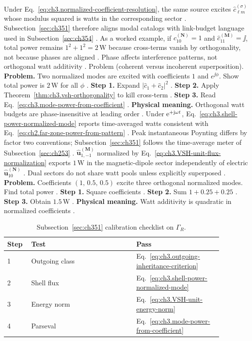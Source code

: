 Under Eq.~\eqref{eq:ch3.normalized-coefficient-resolution}, the same source excites \(\widehat{c}_{\ell m}^{(\sigma)}\) whose
modulus squared is watts in the corresponding sector \cite{harrington2001}. Subsection~\ref{sec:ch351} therefore aligns
modal catalogs with link-budget language used in Subsection~\ref{sec:ch354} \cite{harrington2001}.
As a worked example, if \(\widehat{c}_{10}^{(\mathbf{N})}=1\) and \(\widehat{c}_{11}^{(\mathbf{M})}=\jj\), total power remains
\(1^{2}+1^{2}=2\,\mathrm{W}\) because cross-terms vanish by orthogonality, not because phases are aligned
\cite{stratton1941}. Phase affects interference patterns, not orthogonal watt additivity
\cite{harrington2001}.
Problem (coherent versus incoherent superposition). \textbf{Problem.} Two normalized modes are excited with coefficients \(1\) and \(e^{\jj\phi}\). Show total power is
\(2\,\mathrm{W}\) for all \(\phi\) \cite{hansen1988}.
\textbf{Step 1.} Expand \(|\widehat{c}_{1}+\widehat{c}_{2}|^{2}\) \cite{jackson1999}.
\textbf{Step 2.} Apply Theorem~\ref{thm:ch3.vsh-orthogonality} to kill cross-term \cite{hansen1988}.
\textbf{Step 3.} Read Eq.~\eqref{eq:ch3.mode-power-from-coefficient} \cite{poynting1884}.
\textbf{Physical meaning.} Orthogonal watt budgets are phase-insensitive at leading order \cite{harrington2001}.
Under $\mathrm{e}^{+\mathrm{j}\omega t}$, Eq.~\eqref{eq:ch3.shell-power-normalized-mode} reports time-averaged watts consistent with
Eq.~\eqref{eq:ch2.far-zone-power-from-pattern} \cite{poynting1884}. Peak instantaneous Poynting differs by
factor two conventions; Subsection~\ref{sec:ch351} follows the time-average meter of Subsection~\ref{sec:ch253}
\cite{stratton1941}.
\(\widehat{\mathbf{u}}_{1,-1}^{(\mathbf{M})}\) normalized by Eq.~\eqref{eq:ch3.VSH-unit-flux-normalization} exports
\(1\,\mathrm{W}\) in the magnetic-dipole sector independently of electric \(\widehat{\mathbf{u}}_{10}^{(\mathbf{N})}\)
\cite{belinfante1940}. Dual sectors do not share watt pools unless explicitly superposed
\cite{hansen1988}.
\textbf{Problem.} Coefficients \((1,\,0.5,\,0.5)\) excite three orthogonal normalized modes. Find total power
\cite{harrington2001}.
\textbf{Step 1.} Square coefficients \cite{jackson1999}.
\textbf{Step 2.} Sum \(1+0.25+0.25\) \cite{hansen1988}.
\textbf{Step 3.} Obtain \(1.5\,\mathrm{W}\) \cite{poynting1884}.
\textbf{Physical meaning.} Watt additivity is quadratic in normalized coefficients \cite{harrington2001}.
\begin{table}[t]
\centering
\caption{Subsection~\ref{sec:ch351} calibration checklist on \(\Gamma_R\).}
\label{tab:ch3.351-calibration-checklist}
\small
\begin{tabular}{@{}p{0.08\linewidth}p{0.44\linewidth}p{0.36\linewidth}@{}}
\toprule
Step & Test & Pass \\
\midrule
1 & Outgoing class & Eq.~\eqref{eq:ch3.outgoing-inheritance-criterion} \\
2 & Shell flux & Eq.~\eqref{eq:ch3.shell-power-normalized-mode} \\
3 & Energy norm & Eq.~\eqref{eq:ch3.VSH-unit-energy-norm} \\
4 & Parseval & Eq.~\eqref{eq:ch3.mode-power-from-coefficient} \\
\bottomrule
\end{tabular}
\end{table}
